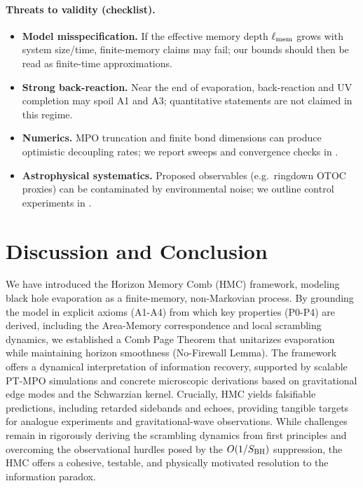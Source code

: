 \documentclass[a4paper,11pt]{article}
\newcommand{\HMC}{\textsc{HMC}\xspace}
\theoremstyle{plain}
\theoremstyle{definition}
\theoremstyle{remark}
\begin{document}
\paragraph{Threats to validity (checklist).}
\begin{itemize}[leftmargin=*,itemsep=0.25em]
  \item \textbf{Model misspecification.} If the effective memory depth $\ell_{\rm mem}$ grows with system size/time, finite-memory claims may fail; our bounds should then be read as finite-time approximations.
  \item \textbf{Strong back-reaction.} Near the end of evaporation, back-reaction and UV completion may spoil A1 and A3; quantitative statements are not claimed in this regime.
  \item \textbf{Numerics.} MPO truncation and finite bond dimensions can produce optimistic decoupling rates; we report sweeps and convergence checks in .
  \item \textbf{Astrophysical systematics.} Proposed observables (e.g.\ ringdown OTOC proxies) can be contaminated by environmental noise; we outline control experiments in .
\end{itemize}


\section{Discussion and Conclusion}
\label{sec:conclusion}
We have introduced the Horizon Memory Comb (\HMC{}) framework, modeling black hole evaporation as a finite-memory, non-Markovian process. By grounding the model in explicit axioms (A1-A4) from which key properties (P0-P4) are derived, including the Area-Memory correspondence and local scrambling dynamics, we established a Comb Page Theorem that unitarizes evaporation while maintaining horizon smoothness (No-Firewall Lemma). The framework offers a dynamical interpretation of information recovery, supported by scalable PT-MPO simulations and concrete microscopic derivations based on gravitational edge modes and the Schwarzian kernel. Crucially, \HMC{} yields falsifiable predictions, including retarded sidebands and echoes, providing tangible targets for analogue experiments and gravitational-wave observations. While challenges remain in rigorously deriving the scrambling dynamics from first principles and overcoming the observational hurdles posed by the $O(1/S_{\rm BH})$ suppression, the \HMC{} offers a cohesive, testable, and physically motivated resolution to the information paradox.
\end{document}
